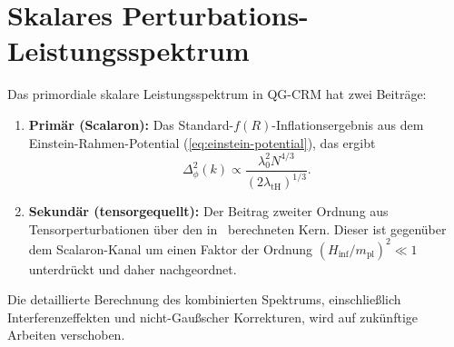 \documentclass[aps,prd,twocolumn,superscriptaddress,nofootinbib]{revtex4-2}
\begin{document}
\section{Skalares Perturbations-Leistungsspektrum}
\label{app:power-spectrum}

Das primordiale skalare Leistungsspektrum in QG-CRM hat zwei Beiträge:

\begin{enumerate}
\item \textbf{Primär (Scalaron):} Das Standard-$f(R)$-Inflationsergebnis aus dem Einstein-Rahmen-Potential (\ref{eq:einstein-potential}), das ergibt~\cite{LiuQuintinAfshordi2026}
\begin{equation}
\Delta_\phi^2(k) \propto \frac{\lambda_0^2 N^{4/3}}{(2\lambda_\mathrm{tH})^{1/3}}.
\end{equation}

\item \textbf{Sekundär (tensorgequellt):} Der Beitrag zweiter Ordnung aus Tensorperturbationen über den in~\cite{Bertacca2025} berechneten Kern. Dieser ist gegenüber dem Scalaron-Kanal um einen Faktor der Ordnung $(H_\mathrm{inf}/m_\mathrm{pl})^2 \ll 1$ unterdrückt und daher nachgeordnet.
\end{enumerate}

Die detaillierte Berechnung des kombinierten Spektrums, einschließlich Interferenzeffekten und nicht-Gaußscher Korrekturen, wird auf zukünftige Arbeiten verschoben.
\end{document}
